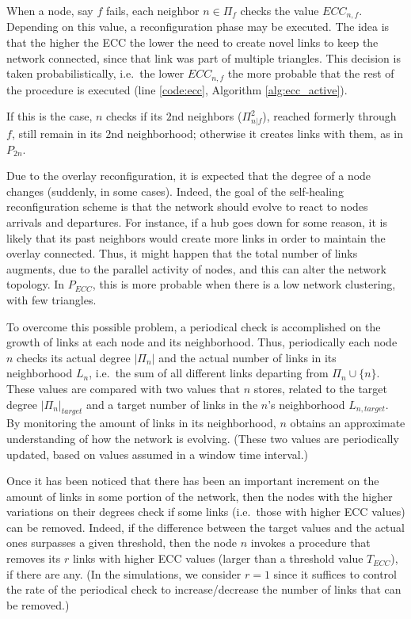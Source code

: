 \documentclass[10pt, conference, compsocconf]{IEEEtran}
\begin{document}
When a node, say $f$ fails, each neighbor $n \in \Pi_f$ checks the value $ECC_{n,f}$.
Depending on this value, a reconfiguration phase may be executed. The idea is that the higher the ECC the lower the need to create novel links to keep the network connected, since that link was part of multiple triangles. This decision is taken probabilistically, i.e.~the lower $ECC_{n,f}$ the more probable that the rest of the procedure is executed (line \ref{code:ecc}, Algorithm \ref{alg:ecc_active}).

If this is the case, $n$ checks if its $2$nd neighbors ($\Pi^2_{n|f}$), reached formerly through $f$, still remain in its $2$nd neighborhood; otherwise it creates links with them, as in $P_{2n}$. 

Due to the overlay reconfiguration, it is expected that the degree of a node changes (suddenly, in some cases). Indeed, the goal of the self-healing reconfiguration scheme is that the network should evolve to react to nodes arrivals and departures. For instance, if a hub goes down for some reason, it is likely that its past neighbors would create more links in order to maintain the overlay connected.
Thus, it might happen that the total number of links augments, due to the parallel activity of nodes, and this can alter the network topology. In $P_{ECC}$, this is more probable when there is a low network clustering, with few triangles.  

To overcome this possible problem, a periodical check is accomplished on the growth of links at each node and its neighborhood. 
Thus, periodically each node $n$ checks its actual degree $|\Pi_n|$ and the actual number of links in its neighborhood $L_{n}$, i.e.~the sum of all different links departing from $\Pi_{n} \cup \{n\}$.
These values are compared with two values that $n$ stores, related to the target degree $|\Pi_n|_{target}$ and a target number of links in the $n$'s neighborhood $L_{n, target}$.
By monitoring the amount of links in its neighborhood, $n$ obtains an approximate understanding of how the network is evolving.
(These two values are periodically updated, based on values assumed in a window time interval.)

Once it has been noticed that there has been an important increment on the amount of links in some portion of the network, then the nodes with the higher variations on their degrees check if some links (i.e.~those with higher ECC values) can be removed.
Indeed, if the difference between the target values and the actual ones surpasses a given threshold, then the node $n$ invokes a procedure that removes its $r$ links with higher ECC values (larger than a threshold value $T_{ECC}$), if there are any. (In the simulations, we consider $r=1$ since it suffices to control the rate of the periodical check to increase/decrease the number of links that can be removed.)
\end{document}
